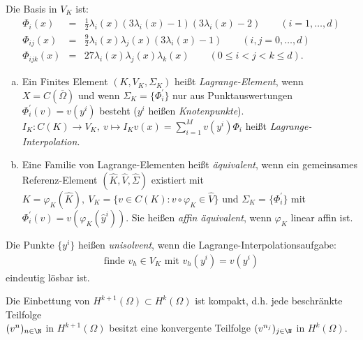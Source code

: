 Die Basis in $V_K$ ist:
\begin{eqnarray*}
        \Phi_i(x)
    &=& \frac{1}{2} \lambda_i(x) (3 \lambda_i(x) - 1)(3 \lambda_i(x) - 2)
        \qquad (i  = 1, \dots, d) \\
        \Phi_{ij}(x)
    &=& \frac{9}{2} \lambda_i(x) \lambda_j(x) (3 \lambda_i(x) -1)
        \qquad (i, j = 0, \dots, d) \\
        \Phi_{ijk}(x)
    &=& 27 \lambda_i(x) \lambda_j(x) \lambda_k(x)
        \qquad (0 \le i < j <k \le d).
\end{eqnarray*}


\begin{Definition}
    \label{def:4.4}
    \begin{enumerate}[a)]
        \item
          Ein Finites Element $(K, V_K, \Sigma_K)$ hei\ss{}t
          \emph{Lagrange-Element}, wenn $X = C(\overline\Omega)$ und wenn
          $\Sigma_K = \{\Phi_i^\prime\}$ nur aus Punktauswertungen
          $\Phi_i^\prime(v) = v(y^i)$ besteht ($y^i$ hei\ss{}en
          \emph{Knotenpunkte}). $I_K: C(K) \to V_K, \ v \mapsto  I_K v(x) =
          \sum_{i=1}^M v(y^i) \Phi_i$ hei\ss{}t \emph{Lagrange-Interpolation}.
        \item
          Eine Familie von Lagrange-Elementen hei\ss{}t \emph{äquivalent},
          wenn ein gemeinsames Referenz-Element $(\hat K, \hat V, \hat\Sigma)$
          existiert mit
          $K = \varphi_K(\hat K), \ V_K = \{v\in C(K): v \circ \varphi_K\in \hat
          V\}$ und $\Sigma_K = \{\Phi_i^\prime\}$ mit $\Phi_i^\prime(v) =
          v(\varphi_K(\hat y^i))$.
          Sie hei\ss{}en \emph{affin äquivalent}, wenn $\varphi_K$ linear
          affin ist.
    \end{enumerate}
\end{Definition}


\begin{Bemerkung}
    Die Punkte $\{y^i\}$ hei\ss{}en \emph{unisolvent}, wenn die
    Lagrange-Interpolationsaufgabe:
    \begin{eqnarray*}
        \text{finde } v_h\in V_K \text{ mit } v_h(y^i) = v(y^i)
    \end{eqnarray*}
    eindeutig lösbar ist.
\end{Bemerkung}


\begin{Satz}
    \label{satz:4.5}
    Die Einbettung von $H^{k+1}(\Omega) \subset H^k(\Omega)$ ist kompakt, d.h.
    jede beschränkte Teilfolge \\
    $(v^n)_{n\in\N}$ in $H^{k+1}(\Omega)$ besitzt eine konvergente Teilfolge
    $(v^{n_j})_{j\in\N}$ in $H^k(\Omega)$.
\end{Satz}


